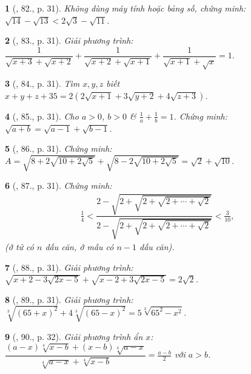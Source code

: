 \documentclass{article}
\newtheorem{baitoan}{}%
\begin{document}
\begin{baitoan}[\cite{Tuyen_Toan_9_old}, 82., p. 31]
	Không dùng máy tính hoặc bảng số, chứng minh: $\sqrt{14} - \sqrt{13} < 2\sqrt{3} - \sqrt{11}$.
\end{baitoan}

\begin{baitoan}[\cite{Tuyen_Toan_9_old}, 83., p. 31]
	Giải phương trình: $\dfrac{1}{\sqrt{x + 3} + \sqrt{x + 2}} + \dfrac{1}{\sqrt{x + 2} + \sqrt{x + 1}} + \dfrac{1}{\sqrt{x + 1} + \sqrt{x}} = 1$. 
\end{baitoan}

\begin{baitoan}[\cite{Tuyen_Toan_9_old}, 84., p. 31]
	Tìm $x,y,z$ biết $x + y + z + 35 = 2(2\sqrt{x + 1} + 3\sqrt{y + 2} +4\sqrt{z + 3})$.
\end{baitoan}

\begin{baitoan}[\cite{Tuyen_Toan_9_old}, 85., p. 31]
	Cho $a > 0$, $b > 0$ \& $\frac{1}{a} + \frac{1}{b} = 1$. Chứng minh: $\sqrt{a + b} = \sqrt{a - 1} + \sqrt{b - 1}$.
\end{baitoan}

\begin{baitoan}[\cite{Tuyen_Toan_9_old}, 86., p. 31]
	Chứng minh: $A = \sqrt{8 + 2\sqrt{10 + 2\sqrt{5}}} + \sqrt{8 - 2\sqrt{10 + 2\sqrt{5}}} = \sqrt{2} + \sqrt{10}$.
\end{baitoan}

\begin{baitoan}[\cite{Tuyen_Toan_9_old}, 87., p. 31]
	Chứng minh:
	\begin{align*}
		\frac{1}{4} < \dfrac{2 - \sqrt{2 + \sqrt{2 + \sqrt{2 + \cdots + \sqrt{2}}}}}{2 - \sqrt{2 + \sqrt{2 + \sqrt{2 + \cdots + \sqrt{2}}}}} < \frac{3}{10},
	\end{align*}
	(ở tử có $n$ dấu căn, ở mẫu có $n - 1$ dấu căn).
\end{baitoan}

\begin{baitoan}[\cite{Tuyen_Toan_9_old}, 88., p. 31]
	Giải phương trình: $\sqrt{x + 2 - 3\sqrt{2x - 5}} + \sqrt{x - 2 + 3\sqrt{2x - 5}} = 2\sqrt{2}$.
\end{baitoan}

\begin{baitoan}[\cite{Tuyen_Toan_9_old}, 89., p. 31]
	Giải phương trình: $\sqrt[3]{(65 + x)^2} + 4\sqrt[3]{(65 - x)^2} = 5\sqrt[3]{65^2 - x^2}$.
\end{baitoan}

\begin{baitoan}[\cite{Tuyen_Toan_9_old}, 90., p. 32]
	Giải phương trình ẩn $x$: $\dfrac{(a - x)\sqrt[4]{x - b} + (x - b)\sqrt[4]{a - x}}{\sqrt[4]{a - x} + \sqrt[4]{x - b}} = \frac{a - b}{2}$ với $a > b$.
\end{baitoan}
\end{document}
